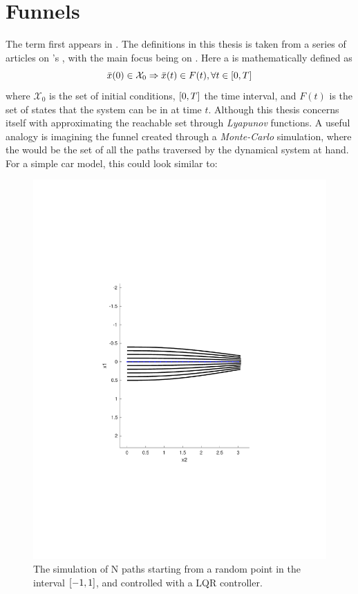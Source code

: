 \chapter{Funnels}

The term \funnel first appears in \cite{masonMechanicsManipulation1985}. The
\funnel definitions in this thesis is taken from a series of articles on
\funnel's \cite{tobenkinInvariantFunnelsTrajectories2010} \cite{tedrakeLQRtreesFeedbackMotion2009} \cite{majumedar2013}
 \cite{majumdarFunnelLibrariesRealtime2017}
 \cite{ahmadiDSOSSDSOSOptimization2017}, with the main focus being on
 \cite{majumdarFunnelLibrariesRealTime2017}. Here a \funnel is mathematically
 defined as
 \[
  \bar{x}(0) \in \mathcal{X}_0 \Rightarrow \bar{x}(t) \in F(t), \forall t \in \lbrack0,T\rbrack
 \]
where \(\mathcal{X}_0\) is the set of initial conditions, \(\lbrack0,T\rbrack\) the time
interval, and \(F(t)\) is the set of states that the system can be in at time
\(t\). Although this thesis concerns itself with approximating the reachable set
through \textit{Lyapunov} functions. A useful analogy is imagining the funnel
created through a \textit{Monte-Carlo} simulation, where the \funnel would
be the set of all the paths traversed by the dynamical system at hand. For a
simple car model, this could look similar to:

\begin{figure}
  \includegraphics[scale=.5]{figures/funnels/montecarlofunnel}
  \caption{The simulation of N paths starting from a random point in the
    interval \(\lbrack-1,1\rbrack\), and controlled with a LQR controller.}
\end{figure}

